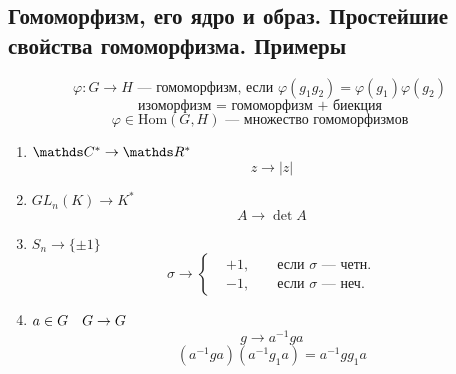\documentclass[main]{subfiles}
\begin{document}
	\subsection{Гомоморфизм, его ядро и образ. Простейшие свойства гомоморфизма. Примеры}

	\begin{Definition}
		\[\varphi : G \to H \text{ --- гомоморфизм, если } \varphi(g_1 g_2) = \varphi(g_1) \varphi(g_2)\]
		\[\text{изоморфизм = гомоморфизм + биекция}\]
		\[\varphi \in \text{Hom}(G, H) \text{ --- множество гомоморфизмов}\]
	\end{Definition}

	\begin{examples}
		\begin{enumerate}
			\item $\CC^* \to \R^*$
			\[z \to |z|\]
			\item $GL_n(K) \to K^*$
			\[A \to \det A\]
			\item $S_n \to  \{\pm 1\}$
			\[\sigma \to \left\{ \begin{align}
				&+1,& &\text{ если } \sigma \text{ --- четн.}\\
				&-1,& &\text{ если } \sigma \text{ --- неч.}
			\end{align}\]
			\item $a \in G \quad G \to G$
			\[g \to a^{-1}g a\]
			\[(a^{-1}g a)(a^{-1}g_1a) = a^{-1} g g_1 a\]
		\end{enumerate}
	\end{examples}
\end{document}

